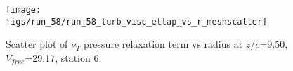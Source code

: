 \begin{figure}[H]
\centering
\texttt{[image: figs/run\_58/run\_58\_turb\_visc\_ettap\_vs\_r\_meshscatter]}
\caption{Scatter plot of $\nu_T$ pressure relaxation term vs radius at $z/c$=9.50, $V_{free}$=29.17, station 6.}
\label{fig:run_58_turb_visc_ettap_vs_r_meshscatter}
\end{figure}


